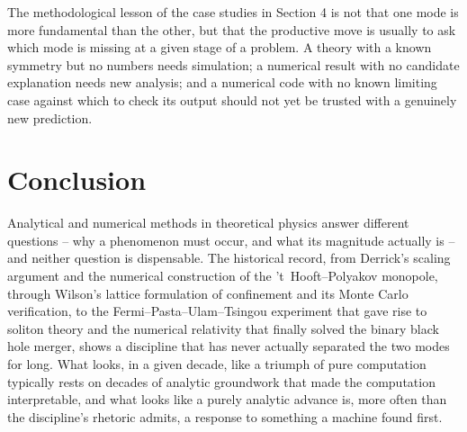 \documentclass[11pt]{article}
\begin{document}
The methodological lesson of the case studies in Section 4 is not that one mode is more fundamental than the other, but that the productive move is usually to ask which mode is missing at a given stage of a problem. A theory with a known symmetry but no numbers needs simulation; a numerical result with no candidate explanation needs new analysis; and a numerical code with no known limiting case against which to check its output should not yet be trusted with a genuinely new prediction.

\section{Conclusion}

Analytical and numerical methods in theoretical physics answer different questions -- why a phenomenon must occur, and what its magnitude actually is -- and neither question is dispensable. The historical record, from Derrick's scaling argument and the numerical construction of the 't~Hooft--Polyakov monopole, through Wilson's lattice formulation of confinement and its Monte Carlo verification, to the Fermi--Pasta--Ulam--Tsingou experiment that gave rise to soliton theory and the numerical relativity that finally solved the binary black hole merger, shows a discipline that has never actually separated the two modes for long. What looks, in a given decade, like a triumph of pure computation typically rests on decades of analytic groundwork that made the computation interpretable, and what looks like a purely analytic advance is, more often than the discipline's rhetoric admits, a response to something a machine found first.
\end{document}

